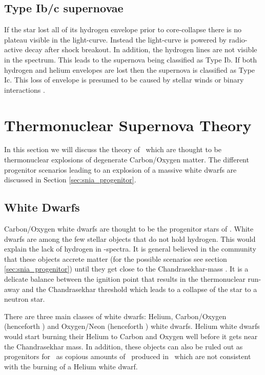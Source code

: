 \subsection{Type Ib/c supernovae}
If the star lost all of its hydrogen envelope prior to core-collapse there is no plateau visible in the light-curve. Instead the light-curve is powered by radio-active decay after shock breakout. In addition, the hydrogen lines are not visible in the spectrum. This leads to the supernova being classified as Type Ib. If both hydrogen and helium envelopes are lost then the supernova is classified as Type Ic. 
This loss of envelope is presumed to be caused by stellar winds or binary interactions \citep{1992ApJ...391..246P}. 


\section{Thermonuclear Supernova Theory}
In this section we will discuss the theory of \sneia\ which are thought to be thermonuclear explosions of degenerate Carbon/Oxygen matter. The different progenitor scenarios leading to an explosion of a massive white dwarfs are discussed in Section \ref{sec:snia_progenitor}.

\subsection{White Dwarfs}
\label{sec:white_dwarfs}
Carbon/Oxygen white dwarfs are thought to be the progenitor stars of \sneia. White dwarfs are among the few stellar objects that do not hold hydrogen. This would explain the lack of hydrogen in \snia-spectra. It is general believed in the community that these objects accrete matter (for the possible scenarios see section \ref{sec:snia_progenitor}) until they get close to the Chandrasekhar-mass \citep[henceforth \mchan;][]{1931ApJ....74...81C}. It is a delicate balance between the ignition point that results in the thermonuclear run-away and the Chandrasekhar threshold which leads to a collapse of the star to a neutron star.
 
There are three main classes of white dwarfs: Helium, Carbon/Oxygen (henceforth \cowd) and Oxygen/Neon (henceforth \onemgwd) white dwarfs. Helium white dwarfs would start burning their Helium to Carbon and Oxygen well before it gets near the Chandrasekhar mass. In addition, these objects can also be ruled out as progenitors for \sneia\ as copious amounts of \ige\ produced in \sneia\, which are not consistent with the burning of a Helium white dwarf. 

